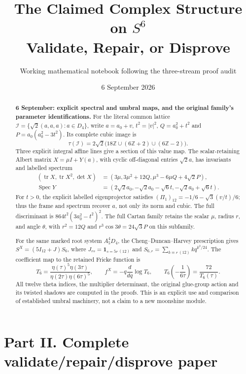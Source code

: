 \documentclass[11pt,letterpaper]{article}
\title{The Claimed Complex Structure on $S^6$\\
Validate, Repair, or Disprove}
\author{Working mathematical notebook following the three-stream proof audit}
\date{6 September 2026}
\theoremstyle{definition}
\theoremstyle{remark}
\begin{document}
\ifdefined\SIXWorkbenchEmbedded
\section*{Part II. Complete validate/repair/disprove paper}
\else
\maketitle
\fi

\begin{abstract}
\noindent\textbf{6 September: explicit spectral and umbral maps, and the original family's parameter identifications.}
For the literal common lattice $\mathcal I=\{\sqrt2(a,a,a):a\in D_4\}$,
write $a=a_0+v$, $t^2=|v|^2$, $Q=a_0^2+t^2$ and
$P=a_0(a_0^2-3t^2)$. Its complete cubic image is
\[
 \tau(\mathcal I)=2\sqrt2\bigl(18\mathbb Z\cup(6\mathbb Z+2)
                                      \cup(6\mathbb Z-2)\bigr).
\]
Three explicit integral affine lines give a section of this value map.
The scalar-retaining Albert matrix $X=\mu I+Y(a)$, with cyclic
off-diagonal entries $\sqrt2a$, has invariants and labelled spectrum
\[
\begin{aligned}
 (\operatorname{tr}X,\operatorname{tr}X^2,\det X)
   &=(3\mu,3\mu^2+12Q,\mu^3-6\mu Q+4\sqrt2P),\\
 \operatorname{Spec}Y
   &=(2\sqrt2a_0,-\sqrt2a_0-\sqrt6t,-\sqrt2a_0+\sqrt6t).
\end{aligned}
\]
For $t>0$, the explicit labelled eigenprojector satisfies
$(\Pi_1)_{12}=-1/6-\sqrt3(v/t)/6$; thus the frame and spectrum
recover $a$, not only its norm and cubic. The full discriminant is
$864t^2(3a_0^2-t^2)^2$. The full Cartan family retains the scalar
$\mu$, radius $r$, and angle $\theta$, with $r^2=12Q$ and
$r^3\cos3\theta=24\sqrt3P$ on this subfamily.

For the same marked root system $A_5^4D_4$, the
Cheng--Duncan--Harvey prescription gives
$S^X=(5I_{12}+J)S_6$, where $J_{rs}=\mathbf1_{s=5r\ (12)}$ and
$S_{6,r}=\sum_{k\equiv r\ (12)}kq^{k^2/24}$.
The coefficient map to the retained Fricke function is
\[
 T_6=\frac{\eta(\tau)^5\eta(3\tau)}{\eta(2\tau)\eta(6\tau)^5},
 \qquad f^X=-q\frac{d}{dq}\log T_6,
 \qquad T_6\!\left(-\frac1{6\tau}\right)=\frac{72}{T_6(\tau)}.
\]
All twelve theta indices, the multiplier determinant, the original
glue-group action and its twisted shadows are computed in the proofs.
This is an explicit use and comparison of established umbral machinery,
not a claim to a new moonshine module.


\end{abstract}
\end{document}
